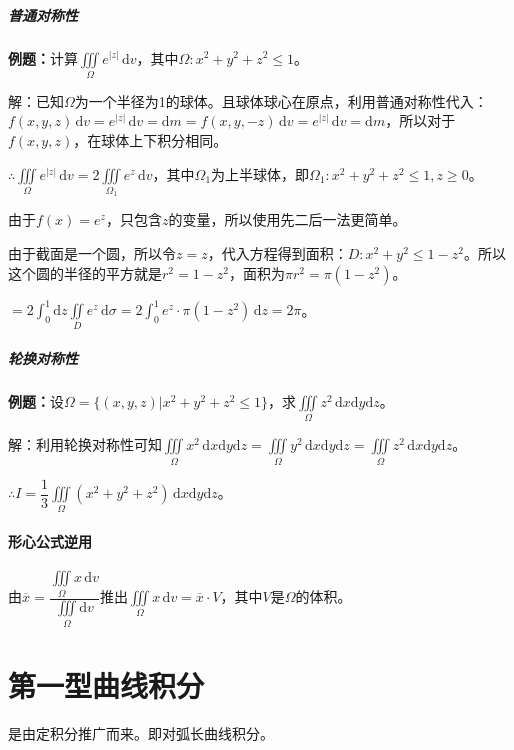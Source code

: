 \subparagraph{普通对称性} \leavevmode \medskip

\textbf{例题：}计算$\iiint\limits_\Omega e^{\vert z\vert}\,\textrm{d}v$，其中$\Omega:x^2+y^2+z^2\leqslant1$。

解：已知$\Omega$为一个半径为1的球体。且球体球心在原点，利用普通对称性代入：$f(x,y,z)\,\textrm{d}v=e^{\vert z\vert}\,\textrm{d}v=\textrm{d}m=f(x,y,-z)\,\textrm{d}v=e^{\vert z\vert}\,\textrm{d}v=\textrm{d}m$，所以对于$f(x,y,z)$，在球体上下积分相同。

$\therefore\iiint\limits_\Omega e^{\vert z\vert}\,\textrm{d}v=2\iiint\limits_{\Omega_1}e^z\,\textrm{d}v$，其中$\Omega_1$为上半球体，即$\Omega_1:x^2+y^2+z^2\leqslant1,z\geqslant0$。

由于$f(x)=e^z$，只包含$z$的变量，所以使用先二后一法更简单。

由于截面是一个圆，所以令$z=z$，代入方程得到面积：$D:x^2+y^2\leqslant1-z^2$。所以这个圆的半径的平方就是$r^2=1-z^2$，面积为$\pi r^2=\pi(1-z^2)$。

$=2\int_0^1\textrm{d}z\iint\limits_De^z\,\textrm{d}\sigma=2\int_0^1e^z\cdot\pi(1-z^2)\,\textrm{d}z=2\pi$。

\subparagraph{轮换对称性} \leavevmode \medskip

\textbf{例题：}设$\Omega=\{(x,y,z)|x^2+y^2+z^2\leqslant1\}$，求$\iiint\limits_\Omega z^2\,\textrm{d}x\textrm{d}y\textrm{d}z$。

解：利用轮换对称性可知$\iiint\limits_\Omega x^2\,\textrm{d}x\textrm{d}y\textrm{d}z=\iiint\limits_\Omega y^2\,\textrm{d}x\textrm{d}y\textrm{d}z=\iiint\limits_\Omega z^2\,\textrm{d}x\textrm{d}y\textrm{d}z$。

$\therefore I=\dfrac{1}{3}\iiint\limits_\Omega(x^2+y^2+z^2)\,\textrm{d}x\textrm{d}y\textrm{d}z$。

\paragraph{形心公式逆用} \leavevmode \medskip

由$\overline{x}=\dfrac{\iiint\limits_\Omega x\,\textrm{d}v}{\iiint\limits_\Omega\textrm{d}v}$推出$\iiint\limits_\Omega x\,\textrm{d}v=\overline{x}\cdot V$，其中$V$是$\Omega$的体积。

\section{第一型曲线积分}

是由定积分推广而来。即对弧长曲线积分。

